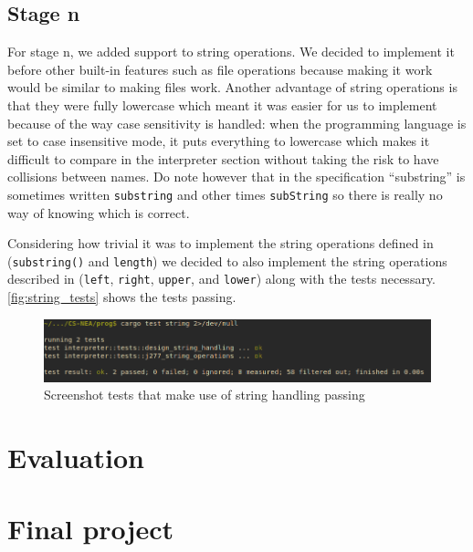 \documentclass{article}
\begin{document}
\subsection{Stage n}

For stage n, we added support to string operations. We decided to implement it
before other built-in features such as file operations because making it work
would be similar to making files work. Another advantage of string operations
is that they were fully lowercase which meant it was easier for us to implement
because of the way case sensitivity is handled: when the programming language
is set to case insensitive mode, it puts everything to lowercase which makes it
difficult to compare in the interpreter section without taking the risk to have
collisions between names. Do note however that in the specification
``substring'' is sometimes written \texttt{substring} and other times
\texttt{subString} so there is really no way of knowing which is correct.

Considering how trivial it was to implement the string operations defined in
 (\texttt{substring()} and \texttt{length}) we decided to also
implement the string operations described in  (\texttt{left},
\texttt{right}, \texttt{upper}, and \texttt{lower}) along with the tests
necessary. \autoref{fig:string_tests} shows the tests passing.

\begin{figure}
	\includegraphics[width=\textwidth]{string_tests}
	\caption{Screenshot tests that make use of string handling passing}
	\label{fig:string_tests}
\end{figure}

\section{Evaluation}


\section{Final project}
\label{sec:final_project}
\end{document}
